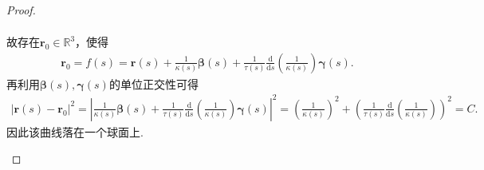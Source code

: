 \documentclass[../../main.tex]{subfiles}%
\begin{document}
\begin{proof}
\begin{enumerate}[(1)]
\begin{align*}
\end{align*}
故存在$\bm{r}_0\in\mathbb{R}^3$，使得
\begin{align*}
\bm{r}_0=f(s)=\bm{r}(s)+\frac{1}{\kappa(s)}\bm{\beta}(s)+\frac{1}{\tau(s)}\frac{\mathrm{d}}{\mathrm{d}s}\left( \frac{1}{\kappa(s)} \right)\bm{\gamma}(s).
\end{align*}
再利用$\bm{\beta}(s),\bm{\gamma}(s)$的单位正交性可得
\begin{align*}
|\bm{r}(s)-\bm{r}_0|^2=\left| \frac{1}{\kappa(s)}\bm{\beta}(s)+\frac{1}{\tau(s)}\frac{\mathrm{d}}{\mathrm{d}s}\left( \frac{1}{\kappa(s)} \right)\bm{\gamma}(s) \right|^2=\left( \frac{1}{\kappa(s)} \right)^2+\left( \frac{1}{\tau(s)}\frac{\mathrm{d}}{\mathrm{d}s}\left( \frac{1}{\kappa(s)} \right) \right)^2=C.
\end{align*}
因此该曲线落在一个球面上.
\end{enumerate}
\end{proof}
\end{document}

